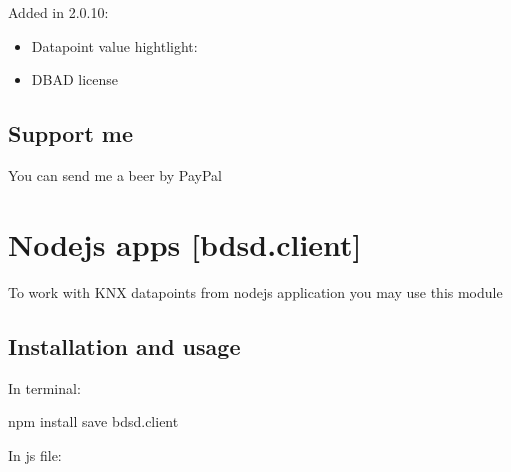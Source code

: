 \documentclass[letterpaper,10pt,english]{sphinxmanual}
\begin{document}
Added in 2.0.10:
\begin{itemize}
\item {} 
Datapoint value hightlight:

\end{itemize}

\begin{itemize}
\item {} 
DBAD license

\end{itemize}


\section{Support me}
\label{\detokenize{bdsd-cli:support-me}}\label{\detokenize{bdsd-cli:support-me}}
You can send me a beer by PayPal



\chapter{Nodejs apps {[}bdsd.client{]}}
\label{\detokenize{bdsd.client:nodejs-apps-bdsd-client}}\label{\detokenize{bdsd.client:nodejs-apps-bdsd-client}}\label{\detokenize{bdsd.client::doc}}
To work with KNX datapoints from nodejs application you may use this module


\section{Installation and usage}
\label{\detokenize{bdsd.client:installation-and-usage}}\label{\detokenize{bdsd.client:installation-and-usage}}
In terminal:

%
\begin{sphinxVerbatim}[commandchars=\\\{\}]
npm install \PYGZhy{}\PYGZhy{}save bdsd.client
\end{sphinxVerbatim}

In js file:
\end{document}
